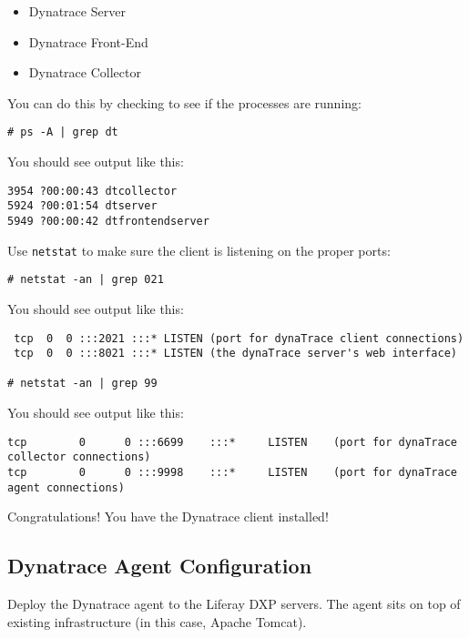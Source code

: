 \begin{enumerate}
  \begin{itemize}
  \tightlist
  \item
    Dynatrace Server
  \item
    Dynatrace Front-End
  \item
    Dynatrace Collector
  \end{itemize}

  You can do this by checking to see if the processes are running:

\begin{verbatim}
# ps -A | grep dt    
\end{verbatim}

  You should see output like this:

\begin{verbatim}
3954 ?00:00:43 dtcollector 
5924 ?00:01:54 dtserver 
5949 ?00:00:42 dtfrontendserver 
\end{verbatim}

  Use \texttt{netstat} to make sure the client is listening on the
  proper ports:

\begin{verbatim}
# netstat -an | grep 021    
\end{verbatim}

  You should see output like this:

\begin{verbatim}
 tcp  0  0 :::2021 :::* LISTEN (port for dynaTrace client connections)    
 tcp  0  0 :::8021 :::* LISTEN (the dynaTrace server's web interface) 

# netstat -an | grep 99    
\end{verbatim}

  You should see output like this:

\begin{verbatim}
tcp        0      0 :::6699    :::*     LISTEN    (port for dynaTrace collector connections)    
tcp        0      0 :::9998    :::*     LISTEN    (port for dynaTrace agent connections)
\end{verbatim}
\end{enumerate}

Congratulations! You have the Dynatrace client installed!

\subsection{Dynatrace Agent
Configuration}\label{dynatrace-agent-configuration}

Deploy the Dynatrace agent to the Liferay DXP servers. The agent sits on
top of existing infrastructure (in this case, Apache Tomcat).


